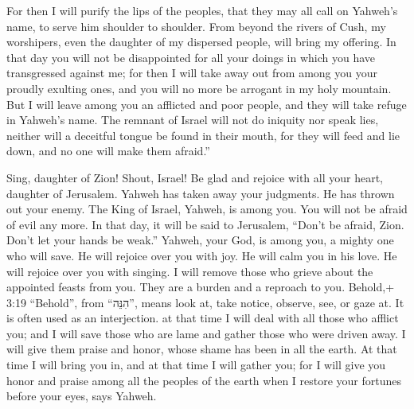  For then I will purify the lips of the peoples, that they
may all call on Yahweh's name, to serve him shoulder to shoulder.
 From beyond the rivers of Cush, my worshipers, even the
daughter of my dispersed people, will bring my offering. 
In that day you will not be disappointed for all your doings in which
you have transgressed against me; for then I will take away out from
among you your proudly exulting ones, and you will no more be arrogant
in my holy mountain.  But I will leave among you an
afflicted and poor people, and they will take refuge in Yahweh's name.
 The remnant of Israel will not do iniquity nor speak lies,
neither will a deceitful tongue be found in their mouth, for they will
feed and lie down, and no one will make them afraid.''

 Sing, daughter of Zion! Shout, Israel! Be glad and rejoice
with all your heart, daughter of Jerusalem.  Yahweh has
taken away your judgments. He has thrown out your enemy. The King of
Israel, Yahweh, is among you. You will not be afraid of evil any more.
 In that day, it will be said to Jerusalem, ``Don't be
afraid, Zion. Don't let your hands be weak.''  Yahweh, your
God, is among you, a mighty one who will save. He will rejoice over you
with joy. He will calm you in his love. He will rejoice over you with
singing.  I will remove those who grieve about the
appointed feasts from you. They are a burden and a reproach to you.
 Behold,+ 3:19 ``Behold'', from ``הִנֵּה'', means look at,
take notice, observe, see, or gaze at. It is often used as an
interjection. at that time I will deal with all those who afflict you;
and I will save those who are lame and gather those who were driven
away. I will give them praise and honor, whose shame has been in all the
earth.  At that time I will bring you in, and at that time
I will gather you; for I will give you honor and praise among all the
peoples of the earth when I restore your fortunes before your eyes, says
Yahweh.
